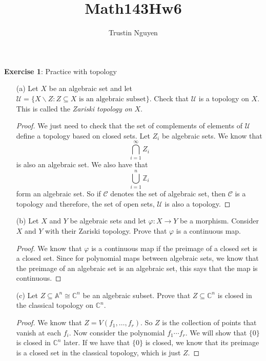 \documentclass{article}
\title{Math143Hw6}
\author{Trustin Nguyen}
\begin{document}
    \maketitle

\reversemarginpar

\textbf{Exercise 1}: Practice with topology
    \begin{itemize}
        \item [(a)] Let $X$ be an algebraic set and let $\mathcal{U} = \{X \backslash Z : Z \subseteq X \text{ is an algebraic subset}\}$. Check that $\mathcal{U}$ is a topology on $X$. This is called the \textit{Zariski topology on} $X$.
            \begin{proof}
                We just need to check that the set of complements of elements of $\mathcal{U}$ define a topology based on closed sets. Let $Z_{i}$ be algebraic sets. We know that 
                    \begin{equation*}
                        \bigcap_{i = 1}^{\infty} Z_{i}
                    \end{equation*}
                is also an algebraic set. We also have that
                    \begin{equation*}
                        \bigcup_{i = 1}^{n} \mathbb{Z}_{i}
                    \end{equation*}
                form an algebraic set. So if $\mathcal{C}$ denotes the set of algebraic set, then $\mathcal{C}$ is a topology and therefore, the set of open sets, $\mathcal{U}$ is also a topology.
            \end{proof} 

        \item [(b)] Let $X$ and $Y$ be algebraic sets and let $\varphi : X \rightarrow Y$ be a morphism. Consider $X$ and $Y$ with their Zariski topology. Prove that $\varphi$ is a continuous map.
            \begin{proof}
                We know that $\varphi$ is a continuous map if the preimage of a closed set is a closed set. Since for polynomial maps between algebraic sets, we know that the preimage of an algebraic set is an algebraic set, this says that the map is continuous.
            \end{proof}

        \item [(c)] Let $Z \subseteq \mathbb{A}^{n} \cong \mathbb{C}^{n}$ be an algebraic subset. Prove that $Z \subseteq \mathbb{C}^{n}$ is closed in the classical topology on $\mathbb{C}^{n}$.
            \begin{proof}
                We know that $Z = V(f_{1}, \ldots , f_{r})$. So $Z$ is the collection of points that vanish at each $f_{i}$. Now consider the polynomial $f_{1} \cdots f_{r}$. We will show that $\{0\}$ is closed in $\mathbb{C}^{n}$ later. If we have that $\{0\}$ is closed, we know that its preimage is a closed set in the classical topology, which is just $Z$. 


\end{proof}
\end{itemize}
\end{document}
